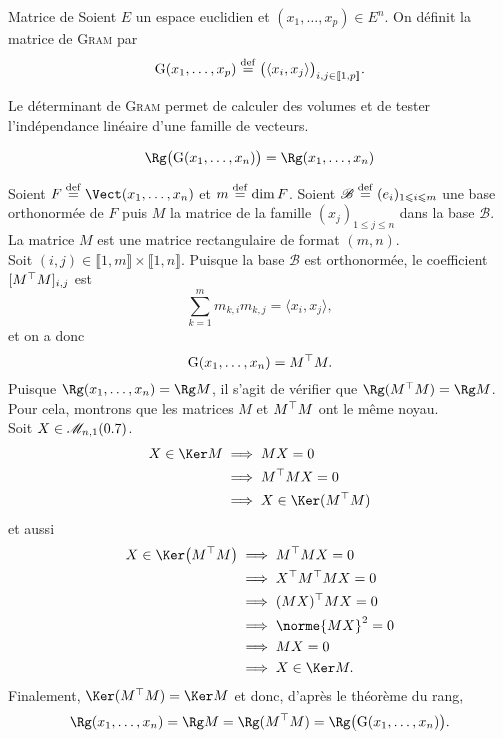 \begin{defi}{Matrice de }
    Soient $E$ un espace euclidien et $(x_1, \dots, x_p) \in E^n$. On définit la matrice de \textsc{Gram} par
    $$\mathrm{G}(x_1, \dots, x_p) \overset{\mathrm{\tiny def}}{=} \big( \langle x_i, x_j \rangle \big)_{i,j \in \llbracket 1, p \rrbracket}.$$
\end{defi}
Le déterminant de \textsc{Gram} permet de calculer des volumes et de tester l'indépendance linéaire d'une famille de vecteurs.
\begin{prop}{}
    $$\Rg \big( \Gram(x_1, \dots, x_n) \big) = \Rg(x_1, \dots, x_n)$$
\end{prop}

\begin{preuve}
    Soient $F \defeq \Vect(x_1, \dots, x_n)$ et $m \overset{\mathrm{\tiny def}}{=} \dim F$. Soient $\mathscr{B} \overset{\mathrm{\tiny def}}{=} (e_i)_{1 \leqslant i \leqslant m}$ une base orthonormée de $F$ puis $M$ la matrice de la famille $(x_j)_{1 \leqslant j \leqslant n}$ dans la base $\mathscr{B}$. La matrice $M$ est une matrice rectangulaire de format $(m, n)$. \\
    Soit $(i, j) \in \llbracket 1, m \rrbracket \times \llbracket 1, n \rrbracket$. Puisque la base $\mathscr{B}$ est orthonormée, le coefficient $[ M^\top M ]_{i,j}$ est 
    $$\sum_{k=1}^m m_{k,i} m_{k,j} = \langle x_i, x_j \rangle,$$
    et on a donc
    $$\mathrm{G}(x_1, \dots, x_n) = M^\top M.$$
    Puisque $\Rg(x_1, \dots, x_n) = \Rg M$, il s'agit de vérifier que $\Rg(\Trsp{M} M) = \Rg M$. Pour cela, montrons que les matrices $M$ et $M^\top M$ ont le même noyau. \\
    Soit $X \in \mathscr{M}_{n,1}(0.7)$.
    \begin{align*}
        X \in \Ker M &\implies MX = 0 \\
        &\implies \Trsp{M}MX = 0 \\
        &\implies X \in \Ker(\Trsp{M}M)
    \end{align*}
    et aussi
    \begin{align*}
        X \in \Ker \big( \Trsp{M}M \big) &\implies \Trsp{M}MX = 0 \\
        &\implies \Trsp{X}\Trsp{M}MX = 0 \\
        &\implies \Trsp{(MX)}MX = 0 \\
        &\implies \norme{MX}^2 = 0 \\
        &\implies MX = 0 \\
        &\implies X \in \Ker M.
    \end{align*}
    Finalement, $\Ker(\Trsp{M}M) = \Ker M$ et donc, d'après le théorème du rang,
    $$\Rg(x_1, \dots, x_n) = \Rg M = \Rg(\Trsp{M}M) = \Rg \big( \Gram(x_1, \dots, x_n) \big).$$
\end{preuve}

